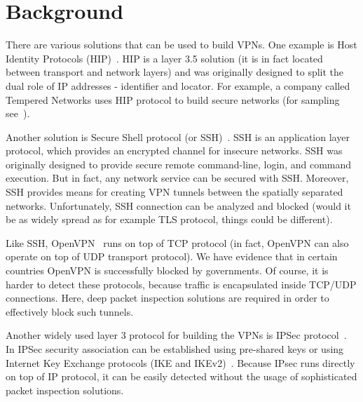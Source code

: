 \section{Background}
\label{section:background}

There are various solutions that can be used to build VPNs. One example is 
Host Identity Protocols (HIP)~\cite{gurtov2008host}. HIP is a layer 3.5 
solution (it is in fact located between transport and network layers) and 
was originally designed to split the dual role of IP addresses - identifier 
and locator. For example, a company called Tempered Networks uses HIP 
protocol to build secure networks (for sampling see~\cite{temperednetworks}).

Another solution is Secure Shell protocol (or SSH)~\cite{ssh}. SSH is an 
application layer protocol, which provides an encrypted channel for insecure 
networks. SSH was originally designed to provide secure remote command-line, 
login, and command execution. But in fact,  any network service can be secured 
with SSH. Moreover, SSH provides means for creating VPN tunnels between the 
spatially separated networks. Unfortunately, SSH connection can be analyzed 
and blocked (would it be as widely spread as for example  TLS protocol, 
things could be different).

Like SSH, OpenVPN~\cite{openvpn} runs on top of TCP protocol (in fact,
OpenVPN can also operate on top of UDP transport protocol).
We have evidence that in certain countries OpenVPN is successfully blocked 
by governments. Of course, it is harder to detect these protocols, because 
traffic is encapsulated inside TCP/UDP connections. Here, deep packet 
inspection solutions are required in order to effectively block such tunnels.

Another widely used layer 3 protocol for building the VPNs is IPSec 
protocol~\cite{ipsec}. In IPSec security association can be established 
using pre-shared keys or using Internet Key Exchange protocols (IKE and 
IKEv2)~\cite{ike}. Because IPsec runs directly on top of IP protocol, it 
can be easily detected without the usage of sophisticated packet inspection 
solutions.
  